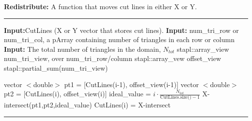 \noindent\begin{minipage}{\textwidth}
\textbf{Redistribute:} A function that moves cut lines in either X or Y. \\
\rule{\textwidth}{0.4pt}
\begin{algorithmic}
\STATE \textbf{Input:}CutLines (X or Y vector that stores cut lines). 
\STATE \textbf{Input:} num\_tri\_row or num\_tri\_col, a pArray containing number of triangles in each row or column 
\STATE \textbf{Input:} The total number of triangles in the domain, $N_{tot}$
\STATE stapl::array\_view num\_tri\_view, over num\_tri\_row/column
\STATE stapl::array\_vew offset\_view
\STATE stapl::partial\_sum(num\_tri\_view) 

	\STATE vector $<$double$>$ pt1 = [CutLines(i-1), offset\_view(i-1)]
	\STATE vector $<$double$>$ pt2 = [CutLines(i), offset\_view(i)]
	\STATE ideal\_value = $i\cdot \frac{N_{tot}}{\text{CutLines.size()}-1}$
	\STATE X-intersect(pt1,pt2,ideal\_value) 
	\STATE CutLines(i) = X-intersect
\ENDFOR
\end{algorithmic}
\rule{\textwidth}{0.4pt}
\end{minipage} 

